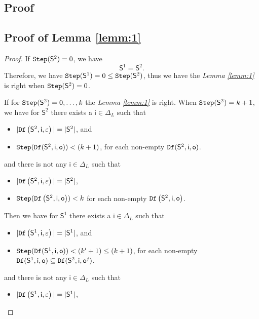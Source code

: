 \begin{appendices}
\section{Proof}
\label{sec:pro}
\subsection{Proof of Lemma \ref{lemm:1}}
\begin{proof}
If ${\tt Step}(\mathsf{S}^{2})=0$, we have  \[\mathsf{S}^{1} = \mathsf{S}^{2}.\] Therefore, we have ${\tt Step}(\mathsf{S}^{1})=0\le{\tt Step}(\mathsf{S}^{2})$, thus we have the {\em Lemma \ref{lemm:1}} is right when ${\tt Step}(\mathsf{S}^{2})=0$.
 
 If for ${\tt Step}(\mathsf{S}^{2})=0,\ldots, k$ the {\em Lemma \ref{lemm:1}} is right. When ${\tt Step}(\mathsf{S}^{2})=k+1$, we have for $\mathsf{S}^{2}$ there exists a $\mathsf{i}\in \Delta_L$ such that
 \begin{itemize}
 \item  $|{\tt Df}\left(\mathsf{S}^{2},\mathsf{i},\varepsilon\right)|=|\mathsf{S}^{2}|$, and 
 \item  ${\tt Step}({\tt Df}(\mathsf{S}^{2},\mathsf{i},\mathsf{o}))<(k+1)$, for each non-empty ${\tt Df}(\mathsf{S}^{2},\mathsf{i},\mathsf{o})$.
 \end{itemize}
 and there is not any $\mathsf{i} \in \Delta_L$ such that
  \begin{itemize}
 \item  $|{\tt Df}\left(\mathsf{S}^{2},\mathsf{i},\varepsilon\right)|=|\mathsf{S}^2|$,
 \item  ${\tt Step}({\tt Df}\left(\mathsf{S}^{2},\mathsf{i},\mathsf{o}\right))< k$ for each non-empty ${\tt Df}\left(\mathsf{S}^{2},\mathsf{i},\mathsf{o}\right)$.
 \end{itemize} 
 Then we have for $\mathsf{S}^{1}$ there exists a $\mathsf{i}\in \Delta_L$ such that
 \begin{itemize}
 \item  $|{\tt Df}\left(\mathsf{S}^{1},\mathsf{i},\varepsilon\right)|=|\mathsf{S}^{1}|$, and 
 \item  ${\tt Step}({\tt Df}(\mathsf{S}^{1},\mathsf{i},\mathsf{o}))<(k'+1)\le (k+1)$, for each non-empty ${\tt Df}(\mathsf{S}^{1},\mathsf{i},\mathsf{o})\subseteq {\tt Df}(\mathsf{S}^{2},\mathsf{i},\mathsf{o}^{j})$.
 \end{itemize}
 and there is not any $\mathsf{i} \in \Delta_L$ such that
  \begin{itemize}
 \item  $|{\tt Df}\left(\mathsf{S}^{1},\mathsf{i},\varepsilon\right)|=|\mathsf{S}^1|$,

\end{itemize}
\end{proof}
\end{appendices}

